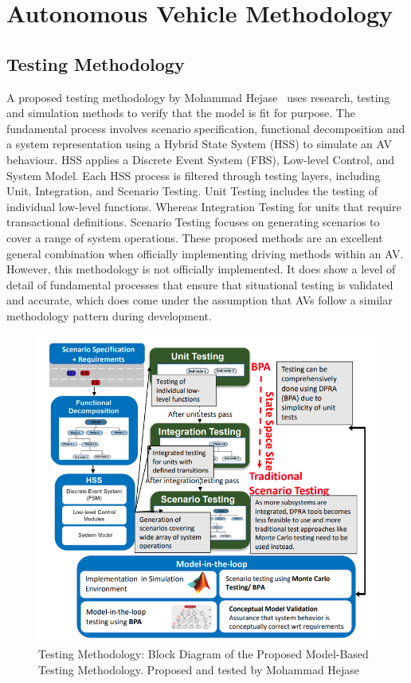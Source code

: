 \documentclass[12pt]{report} %
\begin{document}
\chapter{Autonomous Vehicle Methodology}
\label{chap:autonomousVehicleMethodology}
	\section{Testing Methodology}
		A proposed testing methodology by Mohammad Hejase~\cite{hejase_methodology_2020} uses research, testing and simulation methods to verify that the model is fit for purpose. The fundamental process involves scenario specification, functional decomposition and a system representation using a Hybrid State System (HSS) to simulate an AV behaviour. HSS applies a Discrete Event System (FBS), Low-level Control, and System Model. Each HSS process is filtered through testing layers, including Unit, Integration, and Scenario Testing. Unit Testing includes the testing of individual low-level functions. Whereas Integration Testing for units that require transactional definitions. Scenario Testing focuses on generating scenarios to cover a range of system operations. These proposed methods are an excellent general combination when officially implementing driving methods within an AV. However, this methodology is not officially implemented. It does show a level of detail of fundamental processes that ensure that situational testing is validated and accurate, which does come under the assumption that AVs follow a similar methodology pattern during development.
		\begin{figure}[ht]
			\centering
			\includegraphics[width=.60\columnwidth]{Figures/literature_review/Research/Testing_Methodology.png}
			\caption{Testing Methodology: Block Diagram of the Proposed Model-Based Testing
			Methodology. Proposed and tested by Mohammad Hejase~\cite{hejase_methodology_2020}}
			\label{fig:avmTestingMethodology}
		\end{figure}
\end{document}

